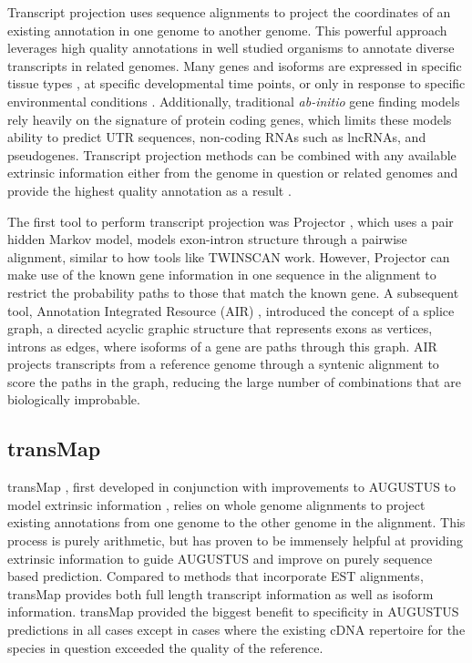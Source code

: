 \documentclass[fleqn,10pt]{wlscirep}
\begin{document}
Transcript projection uses sequence alignments to project the coordinates of an existing annotation in one genome to another genome. This powerful approach leverages high quality annotations in well studied organisms to annotate diverse transcripts in related genomes. Many genes and isoforms are expressed in specific tissue types \cite{gtex2015genotype}, at specific developmental time points, or only in response to specific environmental conditions \cite{peng2011integrative}. Additionally, traditional \textit{ab-initio} gene finding models rely heavily on the signature of protein coding genes, which limits these models ability to predict UTR sequences, non-coding RNAs such as lncRNAs, and pseudogenes. Transcript projection methods can be combined with any available extrinsic information either from the genome in question or related genomes and provide the highest quality annotation as a result \cite{stanke2008using}.

The first tool to perform transcript projection was Projector \cite{meyer2004gene}, which uses a pair hidden Markov model, models exon-intron structure through a pairwise alignment, similar to how tools like TWINSCAN work. However, Projector can make use of the known gene information in one sequence in the alignment to restrict the probability paths to those that match the known gene. A subsequent tool, Annotation Integrated Resource (AIR) \cite{florea2005gene}, introduced the concept of a splice graph, a directed acyclic graphic structure that represents exons as vertices, introns as edges, where isoforms of a gene are paths through this graph. AIR projects transcripts from a reference genome through a syntenic alignment to score the paths in the graph, reducing the large number of combinations that are biologically improbable. 

\subsection{transMap}
transMap \cite{stanke2008using}, first developed in conjunction with improvements to AUGUSTUS to model extrinsic information \cite{stanke2004augustus}, relies on whole genome alignments to project existing annotations from one genome to the other genome in the alignment. This process is purely arithmetic, but has proven to be immensely helpful at providing extrinsic information to guide AUGUSTUS and improve on purely sequence based prediction. Compared to methods that incorporate EST alignments, transMap provides both full length transcript information as well as isoform information. transMap provided the biggest benefit to specificity in AUGUSTUS predictions in all cases except in cases where the existing cDNA repertoire for the species in question exceeded the quality of the reference.
\end{document}
